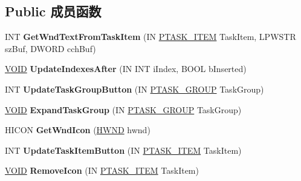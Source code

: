 \subsection*{Public 成员函数}
\begin{DoxyCompactItemize}
\item 
\mbox{\label{class_c_task_switch_wnd_a0e7ba70a5a36282d7d699dfb25c954b3}} 
I\+NT {\bfseries Get\+Wnd\+Text\+From\+Task\+Item} (IN \hyperlink{struct___t_a_s_k___i_t_e_m}{P\+T\+A\+S\+K\+\_\+\+I\+T\+EM} Task\+Item, L\+P\+W\+S\+TR sz\+Buf, D\+W\+O\+RD cch\+Buf)
\item 
\mbox{\label{class_c_task_switch_wnd_a3ce931ceedd73eda96ed709166612c67}} 
\hyperlink{interfacevoid}{V\+O\+ID} {\bfseries Update\+Indexes\+After} (IN I\+NT i\+Index, B\+O\+OL b\+Inserted)
\item 
\mbox{\label{class_c_task_switch_wnd_a7c5abe05a8bdda341c50341132d45938}} 
I\+NT {\bfseries Update\+Task\+Group\+Button} (IN \hyperlink{struct___t_a_s_k___g_r_o_u_p}{P\+T\+A\+S\+K\+\_\+\+G\+R\+O\+UP} Task\+Group)
\item 
\mbox{\label{class_c_task_switch_wnd_a291c4a766468cb02b88251e7606cda23}} 
\hyperlink{interfacevoid}{V\+O\+ID} {\bfseries Expand\+Task\+Group} (IN \hyperlink{struct___t_a_s_k___g_r_o_u_p}{P\+T\+A\+S\+K\+\_\+\+G\+R\+O\+UP} Task\+Group)
\item 
\mbox{\label{class_c_task_switch_wnd_aa28c00bd1a4585533576ec66b0e401c6}} 
H\+I\+C\+ON {\bfseries Get\+Wnd\+Icon} (\hyperlink{interfacevoid}{H\+W\+ND} hwnd)
\item 
\mbox{\label{class_c_task_switch_wnd_a0e096c35be7b746586986ea9c3dee25d}} 
I\+NT {\bfseries Update\+Task\+Item\+Button} (IN \hyperlink{struct___t_a_s_k___i_t_e_m}{P\+T\+A\+S\+K\+\_\+\+I\+T\+EM} Task\+Item)
\item 
\mbox{\label{class_c_task_switch_wnd_a374ae27a50b01fb315a52df8e0528493}} 
\hyperlink{interfacevoid}{V\+O\+ID} {\bfseries Remove\+Icon} (IN \hyperlink{struct___t_a_s_k___i_t_e_m}{P\+T\+A\+S\+K\+\_\+\+I\+T\+EM} Task\+Item)
\item 

\end{DoxyCompactItemize}
